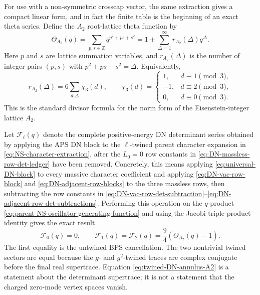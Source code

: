 \documentclass[11pt]{article}
\newcommand{\Z}{\mathbb{Z}}
\begin{document}
For use with a non-symmetric crosscap vector, the same extraction gives a compact linear form,
and in fact the finite table is the beginning of an exact theta series. Define the \(A_2\)
root-lattice theta function by
\begin{equation}
  \Theta_{A_2}(q)
  =
  \sum_{p,s\in\Z}q^{p^2+ps+s^2}
  =
  1+\sum_{\Delta=1}^{\infty}r_{A_2}(\Delta)q^\Delta .
  \label{eq:A2-theta-definition}
\end{equation}
Here \(p\) and \(s\) are lattice summation variables, and \(r_{A_2}(\Delta)\) is the number of
integer pairs \((p,s)\) with \(p^2+ps+s^2=\Delta\). Equivalently,
\begin{equation}
  r_{A_2}(\Delta)
  =
  6\sum_{d|\Delta}\chi_3(d),
  \qquad
  \chi_3(d)=
  \begin{cases}
    1, & d\equiv 1 \pmod 3,\\
   -1, & d\equiv 2 \pmod 3,\\
    0, & d\equiv 0 \pmod 3 .
  \end{cases}
  \label{eq:A2-theta-divisor-formula}
\end{equation}
This is the standard divisor formula for the norm form of the Eisenstein-integer lattice
\(A_2\).

Let \(\mathcal F_\ell(q)\) denote the complete positive-energy DN determinant series obtained
by applying the APS DN block to the \(\ell\)-twined parent character expansion in
\eqref{eq:NS-character-extraction}, after the \(L_0=0\) row constants in
\eqref{eq:DN-massless-row-det-ledger} have been removed. Concretely, this means applying
\eqref{eq:universal-DN-block} to every massive character coefficient and applying
\eqref{eq:DN-vac-row-block} and \eqref{eq:DN-adjacent-row-blocks} to the three massless rows,
then subtracting the row constants in
\eqref{eq:DN-vac-row-det-subtraction}--\eqref{eq:DN-adjacent-row-det-subtractions}. Performing
this operation on the \(q\)-product \eqref{eq:parent-NS-oscillator-generating-function} and
using the Jacobi triple-product identity gives the exact result
\begin{equation}
  \mathcal F_0(q)=0,
  \qquad
  \mathcal F_1(q)=\mathcal F_2(q)
  =
  \frac94\left(\Theta_{A_2}(q)-1\right).
  \label{eq:twined-DN-annulus-A2}
\end{equation}
The first equality is the untwined BPS cancellation. The two nontrivial twined sectors are equal
because the \(g\)- and \(g^2\)-twined traces are complex conjugate before the final real
supertrace. Equation \eqref{eq:twined-DN-annulus-A2} is a statement about the determinant
supertrace; it is not a statement that the charged zero-mode vertex spaces vanish.
\end{document}
